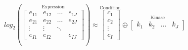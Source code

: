 \documentclass{standalone}
\begin{document}
\begin{equation}

  log_{2}(
  \stackrel{\mbox{Expression}}
  {
    \begin{bmatrix}
    e_{11} & e_{12} & \dots & e_{1J}\\
    e_{21} & e_{22} & \dots & e_{2J}\\
    \vdots & \vdots & \ddots & \\
    e_{I1} &    e_{I2}   &   & e_{IJ} 
  \end{bmatrix}%
  }
  )
  \approx
  \stackrel{\mbox{Condition}}
  {
  \begin{bmatrix}
    c_{1}  \\
    c_{2}  \\
    \vdots \\
    c_{I} 
  \end{bmatrix}
  }
  \oplus
  \stackrel{\mbox{Kinase}}
  {
  \begin{bmatrix}
    k_{1} &
    k_{2} &
    \hdots &
    k_{J} 
  \end{bmatrix}
  }
\end{equation}
\end{document}
